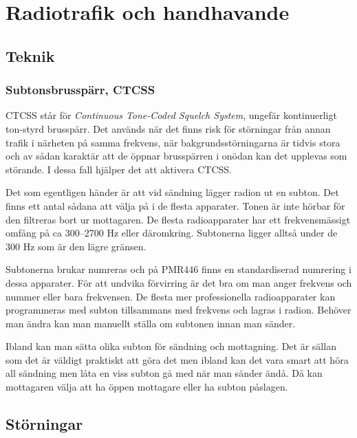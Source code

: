\chapter{Radiotrafik och handhavande}
\label{kap:radiotrafik}

\section{Teknik}

\subsection{Subtonsbrusspärr, CTCSS}

CTCSS står för \textit{Continuous Tone-Coded Squelch System}, ungefär kontinuerligt ton-styrd brusspärr. Det används när det finns risk för störningar från annan trafik i närheten på samma frekvens, när bakgrundsstörningarna är tidvis stora och av sådan karaktär att de öppnar brusspärren i onödan kan det upplevas som störande. I dessa fall hjälper det att aktivera CTCSS.

Det som egentligen händer är att vid sändning lägger radion ut en subton. Det finns ett antal sådana att välja på i de flesta apparater. Tonen är inte hörbar för den filtreras bort ur mottagaren. De flesta radioapparater har ett frekvensmässigt omfång på ca 300--2700 Hz eller däromkring. Subtonerna ligger alltså under de 300 Hz som är den lägre gränsen.

Subtonerna brukar numreras och på PMR446 finns en standardiserad numrering i dessa apparater. För att undvika förvirring är det bra om man anger frekvens och nummer eller bara frekvensen. De flesta mer professionella radioapparater kan programmeras med subton tillsammans med frekvens och lagras i radion. Behöver man ändra kan man manuellt ställa om subtonen innan man sänder.

Ibland kan man sätta olika subton för sändning och mottagning. Det är sällan som det är väldigt praktiskt att göra det men ibland kan det vara smart att höra all sändning men låta en viss subton gå med när man sänder ändå. Då kan mottagaren välja att ha öppen mottagare eller ha subton påslagen.



\section{Störningar}

